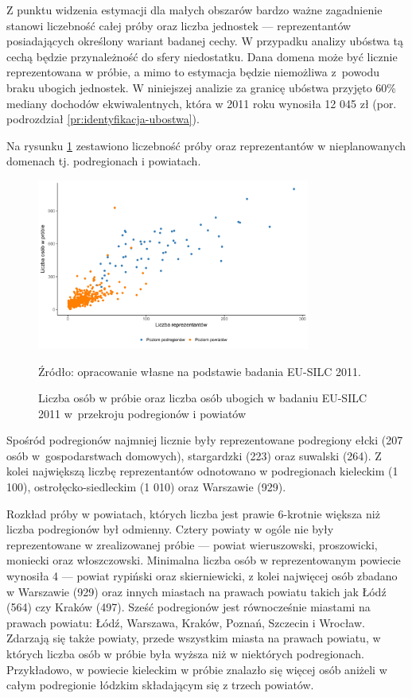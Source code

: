 Z punktu widzenia estymacji dla małych obszarów bardzo ważne zagadnienie stanowi liczebność całej próby oraz liczba jednostek --- reprezentantów posiadających określony wariant badanej cechy. W przypadku analizy ubóstwa tą cechą będzie przynależność do sfery niedostatku. Dana domena może być licznie reprezentowana w próbie, a mimo to estymacja będzie niemożliwa z~powodu braku ubogich jednostek. W niniejszej analizie za granicę ubóstwa przyjęto 60\% mediany dochodów ekwiwalentnych, która w 2011 roku wynosiła 12 045 zł (por. podrozdział \ref{pr:identyfikacja-ubostwa}).

Na rysunku \ref{fig:proba_reprez} zestawiono liczebność próby oraz reprezentantów w nieplanowanych domenach tj. podregionach i powiatach.

\begin{figure}[htp]
\centering
\includegraphics[width=0.8\textwidth]{04_wykresy/liczebnosc_proby_i_reprezentantow-1.pdf}
\caption{Liczba osób w próbie oraz liczba osób ubogich w badaniu EU-SILC 2011 w~przekroju podregionów i powiatów}
\small{Źródło: opracowanie własne na podstawie badania EU-SILC 2011.}
\label{fig:proba_reprez}
\end{figure}

Spośród podregionów najmniej licznie były reprezentowane podregiony ełcki (207 osób w~gospodarstwach domowych), stargardzki (223) oraz suwalski (264). Z kolei największą liczbę reprezentantów odnotowano w podregionach kieleckim (1 100), ostrołęcko-siedleckim (1 010) oraz Warszawie (929).

Rozkład próby w powiatach, których liczba jest prawie 6-krotnie większa niż liczba podregionów był odmienny. Cztery powiaty w ogóle nie były reprezentowane w zrealizowanej próbie --- powiat wieruszowski, proszowicki, moniecki oraz włoszczowski. Minimalna liczba osób w reprezentowanym powiecie wynosiła 4 --- powiat rypiński oraz skierniewicki, z kolei najwięcej osób zbadano w Warszawie (929) oraz innych miastach na prawach powiatu takich jak Łódź (564) czy Kraków (497). Sześć podregionów jest równocześnie miastami na prawach powiatu: Łódź, Warszawa, Kraków, Poznań, Szczecin i Wrocław. Zdarzają się także powiaty, przede wszystkim miasta na prawach powiatu, w których liczba osób w próbie była wyższa niż w niektórych podregionach. Przykładowo, w powiecie kieleckim w próbie znalazło się więcej osób aniżeli w całym podregionie łódzkim składającym się z trzech powiatów.

